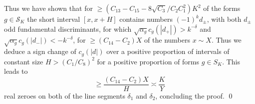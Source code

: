 \documentclass[a4paper,10pt,twoside]{amsart}
\theoremstyle{definition}
\numberwithin{equation}{section}
\renewcommand\:{\colon}
\begin{document}
Thus we have shown that for $\geq(C_{13}-C_{15}-8\sqrt{C_3}/C_2C_1^2)K^2$ of the forms $g\in\mathcal S_K$ the short interval $[x,x+H]$ contains numbers $(-1)^k d_\pm$, with both $d_\pm$ odd fundamental discriminants, for which $\sqrt{\alpha_g}c_g(|d_+|)>k^{-\delta}$ and $\sqrt{\alpha_g}c_g(|d_-|)<-k^{-\delta}$, for $\geq (C_{14}-C_2)X$ of the numbers $x\sim X$. Thus we deduce a sign change of $c_g(|d|)$ over a positive proportion of intervals of constant size $H>(C_1/C_8)^2$ for a positive proportion of forms $g\in S_K$. This leads to 
\[ 
\geq \frac{(C_{14}-C_2)X}{H}\asymp\frac{K}{Y}
\]
real zeroes on both of the line segments $\delta_1$ and $\delta_2$, concluding the proof. \qed



\end{document}
